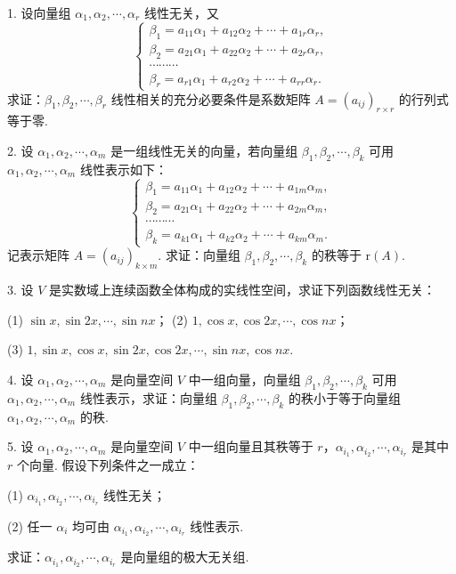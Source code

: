 \documentclass[UTF8, 12pt, fontset=fandol, oneside]{ctexart}
\begin{document}
1. 设向量组 $\alpha_1,\alpha_2,\cdots,\alpha_r$ 线性无关，又
\[
\left\{\begin{array}{c}
\beta_1=a_{11}\alpha_1+a_{12}\alpha_2+\cdots+a_{1r}\alpha_r,\\
\beta_2=a_{21}\alpha_1+a_{22}\alpha_2+\cdots+a_{2r}\alpha_r,\\
\cdots\cdots\cdots\\
\beta_r=a_{r1}\alpha_1+a_{r2}\alpha_2+\cdots+a_{rr}\alpha_r.
\end{array}\right.
\]
求证：$\beta_1,\beta_2,\cdots,\beta_r$ 线性相关的充分必要条件是系数矩阵 $A=(a_{ij})_{r\times r}$ 的行列式等于零.

2. 设 $\alpha_1,\alpha_2,\cdots,\alpha_m$ 是一组线性无关的向量，若向量组 $\beta_1,\beta_2,\cdots,\beta_k$ 可用 $\alpha_1,\alpha_2,\cdots,\alpha_m$ 线性表示如下：
\[
\left\{\begin{array}{c}
\beta_1=a_{11}\alpha_1+a_{12}\alpha_2+\cdots+a_{1m}\alpha_m,\\
\beta_2=a_{21}\alpha_1+a_{22}\alpha_2+\cdots+a_{2m}\alpha_m,\\
\cdots\cdots\cdots\\
\beta_k=a_{k1}\alpha_1+a_{k2}\alpha_2+\cdots+a_{km}\alpha_m.
\end{array}\right.
\]
记表示矩阵 $A=(a_{ij})_{k\times m}$. 求证：向量组 $\beta_1,\beta_2,\cdots,\beta_k$ 的秩等于 $\mathrm{r}(A)$.

3. 设 $V$ 是实数域上连续函数全体构成的实线性空间，求证下列函数线性无关：

(1) $\sin x,\sin 2x,\cdots,\sin nx$；\qquad
(2) $1,\cos x,\cos 2x,\cdots,\cos nx$；

(3) $1,\sin x,\cos x,\sin 2x,\cos 2x,\cdots,\sin nx,\cos nx$.

4. 设 $\alpha_1,\alpha_2,\cdots,\alpha_m$ 是向量空间 $V$ 中一组向量，向量组 $\beta_1,\beta_2,\cdots,\beta_k$ 可用 $\alpha_1,\alpha_2,\cdots,\alpha_m$ 线性表示，求证：向量组 $\beta_1,\beta_2,\cdots,\beta_k$ 的秩小于等于向量组 $\alpha_1,\alpha_2,\cdots,\alpha_m$ 的秩.

5. 设 $\alpha_1,\alpha_2,\cdots,\alpha_m$ 是向量空间 $V$ 中一组向量且其秩等于 $r$，$\alpha_{i_1},\alpha_{i_2},\cdots,\alpha_{i_r}$ 是其中 $r$ 个向量. 假设下列条件之一成立：

(1) $\alpha_{i_1},\alpha_{i_2},\cdots,\alpha_{i_r}$ 线性无关；

(2) 任一 $\alpha_i$ 均可由 $\alpha_{i_1},\alpha_{i_2},\cdots,\alpha_{i_r}$ 线性表示.

求证：$\alpha_{i_1},\alpha_{i_2},\cdots,\alpha_{i_r}$ 是向量组的极大无关组.
\end{document}
